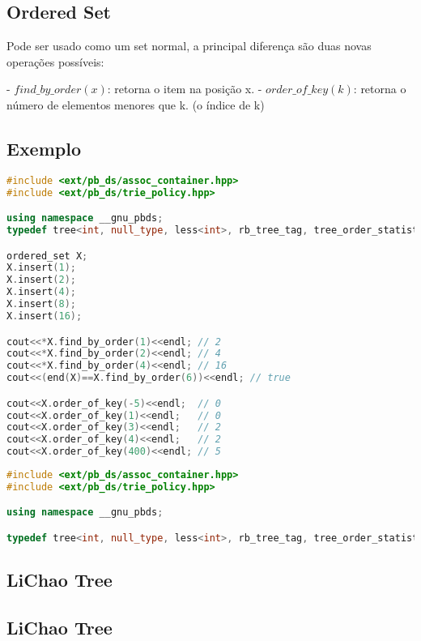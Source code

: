 \documentclass[11pt, a4paper, twoside]{article}
\begin{document}
\subsection{Ordered Set}



Pode ser usado como um set normal, a principal diferença são duas novas operações possíveis:

- $find\_by\_order(x)$: retorna o item na posição x.
- $order\_of\_key(k)$: retorna o número de elementos menores que k. (o índice de k)

\subsection{Exemplo}

\begin{lstlisting}[language=C++]
#include <ext/pb_ds/assoc_container.hpp>
#include <ext/pb_ds/trie_policy.hpp>

using namespace __gnu_pbds;
typedef tree<int, null_type, less<int>, rb_tree_tag, tree_order_statistics_node_update> ordered_set;

ordered_set X;
X.insert(1);
X.insert(2);
X.insert(4);
X.insert(8);
X.insert(16);

cout<<*X.find_by_order(1)<<endl; // 2
cout<<*X.find_by_order(2)<<endl; // 4
cout<<*X.find_by_order(4)<<endl; // 16
cout<<(end(X)==X.find_by_order(6))<<endl; // true

cout<<X.order_of_key(-5)<<endl;  // 0
cout<<X.order_of_key(1)<<endl;   // 0
cout<<X.order_of_key(3)<<endl;   // 2
cout<<X.order_of_key(4)<<endl;   // 2
cout<<X.order_of_key(400)<<endl; // 5

\end{lstlisting}


\begin{lstlisting}[language=C++]
#include <ext/pb_ds/assoc_container.hpp>
#include <ext/pb_ds/trie_policy.hpp>

using namespace __gnu_pbds;

typedef tree<int, null_type, less<int>, rb_tree_tag, tree_order_statistics_node_update> ordered_set;
\end{lstlisting}

\subsection{LiChao Tree}

\subsection{LiChao Tree}
\end{document}
